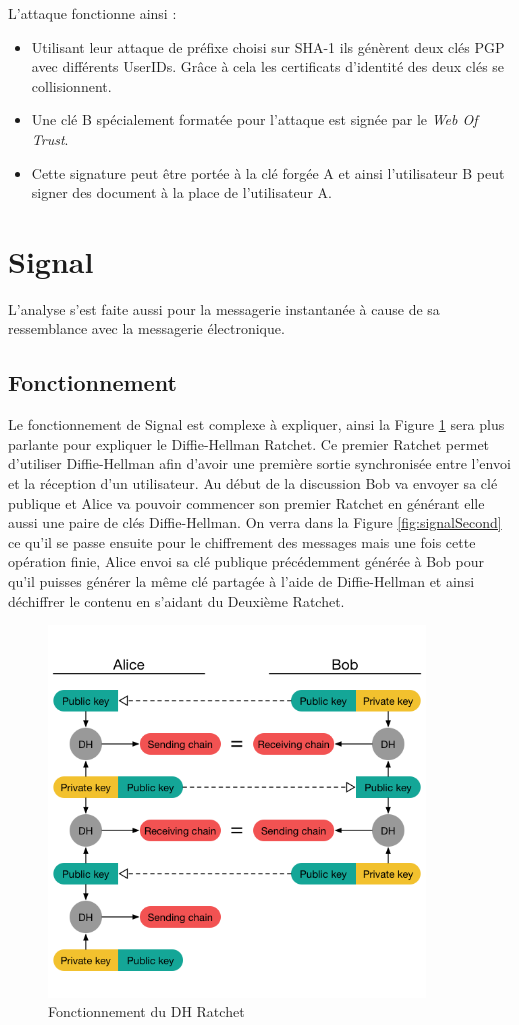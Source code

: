 L'attaque fonctionne ainsi : 
\begin{itemize}
	\item Utilisant leur attaque de préfixe choisi sur SHA-1 ils génèrent deux clés PGP avec différents UserIDs. Grâce à cela les certificats d'identité des deux clés se collisionnent.
	\item Une clé B spécialement formatée pour l'attaque est signée par le \textit{Web Of Trust}.
	\item Cette signature peut être portée à la clé forgée A et ainsi l'utilisateur B peut signer des document à la place de l'utilisateur A.
\end{itemize}
\section{Signal}
L'analyse s'est faite aussi pour la messagerie instantanée à cause de sa ressemblance avec la messagerie électronique. 
\subsection{Fonctionnement}
Le fonctionnement de Signal est complexe à expliquer, ainsi la Figure \ref{fig:signal} sera plus parlante pour expliquer le Diffie-Hellman Ratchet. Ce premier Ratchet permet d'utiliser Diffie-Hellman afin d'avoir une première sortie synchronisée entre l'envoi et la réception d'un utilisateur. Au début de la discussion Bob va envoyer sa clé publique et Alice va pouvoir commencer son premier Ratchet en générant elle aussi une paire de clés Diffie-Hellman. On verra dans la Figure \ref{fig:signalSecond} ce qu'il se passe ensuite pour le chiffrement des messages mais une fois cette opération finie, Alice envoi sa clé publique précédemment générée à Bob pour qu'il puisses générer la même clé partagée à l'aide de Diffie-Hellman et ainsi déchiffrer le contenu en s'aidant du Deuxième Ratchet.

\begin{figure}[h!]
	\centering
	\includegraphics[width=10cm]{images/signalFonctionnement.png}
	\caption{Fonctionnement du DH Ratchet~\cite{doubleratchet}}
	\label{fig:signal}
\end{figure}

